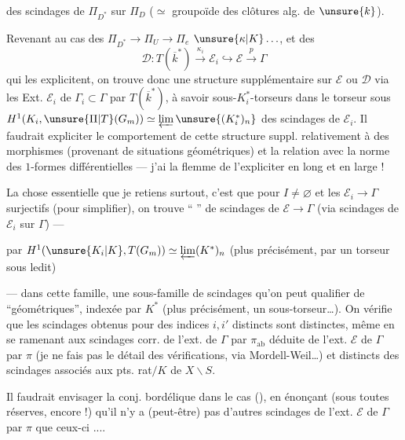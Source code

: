

des scindages de $\Pi_{D^*}$  sur $\Pi_D$ ($\simeq$ groupoïde des clôtures alg. de $\unsure{k}$).

Revenant au cas des  $\Pi_{D^*}\to\Pi_U\to\Pi_e$ $\unsure{\kappa|K}\ldots$, et des 
\[
\mathcal{D}:T(\overline{k}^*)\xrightarrow{\kappa_i}\mathcal{E}_i\hookrightarrow\mathcal{E}\xrightarrow{p}\Gamma
\]
qui les explicitent, on trouve donc une structure supplémentaire sur $\mathcal{E}$ ou $\mathcal{D}$ via  les Ext. $\mathcal{E}_i$ de $\Gamma_i\subset\Gamma$ par $T(\overline{k}^*)$, à savoir   sous-$K_i^*$-torseurs dans le torseur sous
$H^1(K_i,\unsure{\Pi|T}(G_m))\simeq\varprojlim\unsure{(K_i^*)_n}$ des  scindages de $\mathcal{E}_i$.
Il faudrait expliciter le comportement de cette structure suppl. relativement à des morphismes (provenant de situations géométriques) et la relation avec la norme des $1$-formes différentielles --- j'ai la flemme de l'expliciter en long et en large !

La chose essentielle que je retiens surtout, c'est que pour $I\ne\varnothing$ et les $\mathcal{E}_i\to\Gamma$ surjectifs (pour simplifier), on trouve   `` '' de scindages de $\mathcal{E}\to\Gamma$ (via scindages de $\mathcal{E}_i$ sur $\Gamma$) ---  



par $H^1(\unsure{K_i|K},T(G_m))\simeq\varprojlim(K^*)_n$ (plus précisément, par un torseur sous ledit)

--- dans cette famille, une sous-famille de scindages qu'on peut qualifier de ``géométriques'', indexée par $K^*$ (plus précisément, un sous-torseur\ldots).
On vérifie que les scindages obtenus pour des indices $i,i'$ distincts sont distinctes, même en se ramenant aux \unsure{$\pi$-}scindages corr. de l'ext. de $\Gamma$ par $\pi_{\mathrm{ab}}$ déduite de l'ext. $\mathcal{E}$ de $\Gamma$ par $\pi$ (je ne fais pas le détail des vérifications, via Mordell-Weil\ldots) et distincts des scindages associés aux pts. rat$/K$ de $X\backslash S$.

Il faudrait envisager la conj. bordélique dans le cas (\uline{}), en énonçant (sous toutes réserves, encore !) qu'il n'y a (peut-être) pas d'autres scindages de l'ext. $\mathcal{E}$ de $\Gamma$ par $\pi$ que ceux-ci ....

